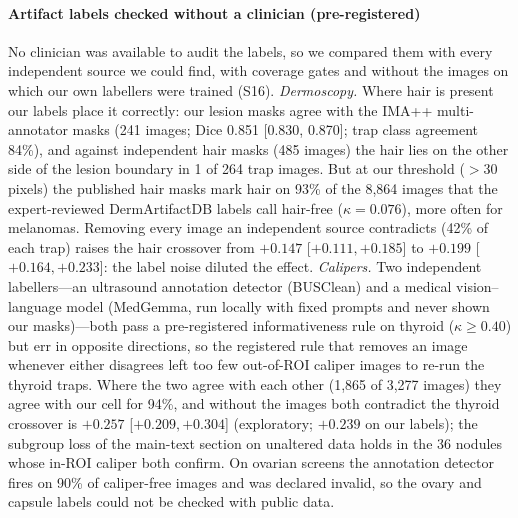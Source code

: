 \paragraph{Artifact labels checked without a clinician (pre-registered)}
No clinician was available to audit the labels, so we compared them with every independent source we could find, with
coverage gates and without the images on which our own labellers were trained (S16). \emph{Dermoscopy.}
Where hair is present our labels place it correctly: our lesion masks agree with the IMA++ multi-annotator masks (241
images; Dice 0.851 [0.830, 0.870]; trap class agreement 84\%), and against independent hair masks (485 images) the hair
lies on the other side of the lesion boundary in 1 of 264 trap images. But at our threshold ($>30$ pixels) the published
hair masks mark hair on 93\% of the 8,864 images that the expert-reviewed DermArtifactDB labels call hair-free
($\kappa=0.076$), more often for melanomas. Removing every image an independent source contradicts (42\% of each trap)
raises the hair crossover from $+0.147$ [$+0.111, +0.185$] to $+0.199$ [$+0.164, +0.233$]: the label noise diluted
the effect. \emph{Calipers.} Two independent labellers---an ultrasound annotation detector (BUSClean) and a medical
vision--language model (MedGemma, run locally with fixed prompts and never shown our masks)---both pass a pre-registered
informativeness rule on thyroid ($\kappa\ge0.40$) but err in opposite directions, so the registered rule that removes an
image whenever either disagrees left too few out-of-ROI caliper images to re-run the thyroid traps. Where the two agree
with each other (1,865 of 3,277 images) they agree with our cell for 94\%, and without the images both contradict the
thyroid crossover is $+0.257$ [$+0.209, +0.304$] (exploratory; $+0.239$ on our labels); the subgroup loss of
the main-text section on unaltered data holds in the 36 nodules whose in-ROI caliper both confirm. On ovarian screens the annotation
detector fires on 90\% of caliper-free images and was declared invalid, so the ovary and capsule labels could not be
checked with public data.

